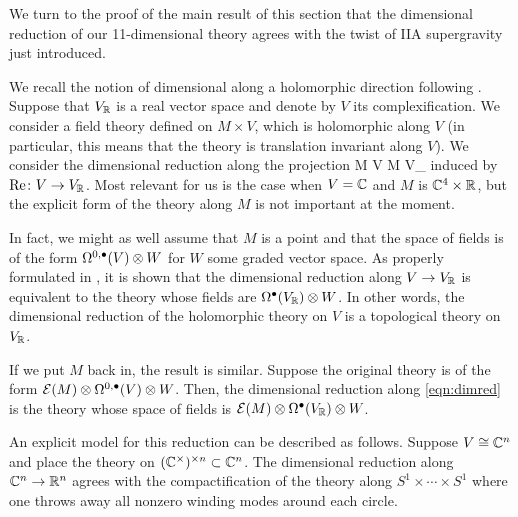 \parsec[-]

We turn to the proof of the main result of this section that the dimensional reduction of our 11-dimensional theory agrees with the twist of IIA supergravity just introduced. 

We recall the notion of dimensional along a holomorphic direction following \cite{ESW}. 
Suppose that $V_\mathbb R$ is a real vector space and denote by $V$ its complexification. 
We consider a field theory defined on $M \times V$, which is holomorphic along $V$ (in particular, this means that the theory is translation invariant along $V$).  
We consider the dimensional reduction along the projection 
\beqn\label{eqn:dimred}
M \times V \to M \times V_\RR
\eeqn
induced by ${\rm Re} \colon V \to V_\mathbb R$.
Most relevant for us is the case when $V = \mathbb C$ and $M$ is $\mathbb C^4 \times \mathbb R$, but the explicit form of the theory along $M$ is not important at the moment.

In fact, we might as well assume that $M$ is a point and that the space of fields is of the form $\Omega^{0,\bullet}(V) \otimes W$ for $W$ some graded vector space. 
As properly formulated in \cite{ESW}, it is shown that the dimensional reduction along $V \to V_\mathbb R$ is equivalent to the theory whose fields are $\Omega^\bullet(V_\mathbb R) \otimes W$. 
In other words, the dimensional reduction of the holomorphic theory on $V$ is a topological theory on $V_\mathbb R$. 

If we put $M$ back in, the result is similar. 
Suppose the original theory is of the form $\mathcal E(M) \otimes \Omega^{0,\bullet}(V) \otimes W$.
Then, the dimensional reduction along \eqref{eqn:dimred} is the theory whose space of fields is $\mathcal E(M) \otimes \Omega^\bullet(V_\mathbb R) \otimes W$.

An explicit model for this reduction can be described as follows. 
Suppose $V \cong \mathbb C^n$ and place the theory on $(\mathbb C^\times)^{\times n} \subset \mathbb C^n$. 
The dimensional reduction along $\mathbb C^n \to \mathbb R^n$ agrees with the compactification of the theory along $S^1 \times \cdots \times S^1$ where one throws away all nonzero winding modes around each circle.

